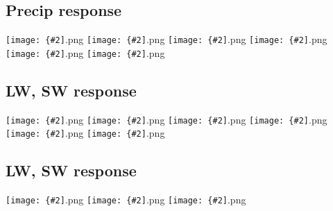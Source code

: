 \documentclass[12pt,a4paper]{article}
\newcommand{\pngfig}[2][0.5]{\texttt{[image: \{\#2]}.png}}
\begin{document}
\subsection{Precip response}
\pngfig[0.5]{comp_precip_max}
\pngfig[0.5]{comp_precip_min}
\pngfig[0.5]{comp_rainconv_max}
\pngfig[0.5]{comp_rainconv_min}
\pngfig[0.5]{comp_rainlgsc_max}
\pngfig[0.5]{comp_rainlgsc_min}

\subsection{LW, SW response}

\pngfig[0.5]{comp_lwclsky_max}
\pngfig[0.5]{comp_lwclsky_min}
\pngfig[0.5]{comp_dlwr_max}
\pngfig[0.5]{comp_dlwr_min}
\pngfig[0.5]{comp_dswr_max}
\pngfig[0.5]{comp_dswr_min}

\subsection{LW, SW response}

\pngfig[0.5]{comp_smc_max}
\pngfig[0.5]{comp_smc_min}
\pngfig[0.5]{smc_clim}
\end{document}
